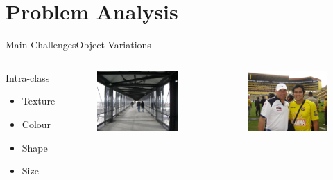 \section{Problem Analysis}
\begin{frame}{Main Challenges}{Object Variations}
\begin{columns}
        \begin{block}{Intra-class}
        \begin{itemize}
            \item Texture
            \item Colour
            \item Shape
            \item Size
        \end{itemize}
            

        \end{block}
        \begin{figure}
            \includegraphics[width=0.7 \textwidth]{figs/000066.jpg}
        \end{figure}
        \begin{figure}
            \includegraphics[width=0.7 \textwidth]{figs/000076.jpg}
        \end{figure}


\end{columns}
\end{frame}
